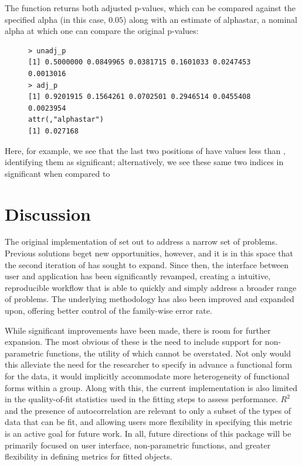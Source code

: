 The  function returns both adjusted p-values, which can be compared against the specified alpha (in this case, $0.05$) along with an estimate of alphastar, a nominal alpha at which one can compare the original p-values:

\begin{singlespace}
\begin{figure}[H]
\centering
\begin{BVerbatim}
> unadj_p
[1] 0.5000000 0.0849965 0.0381715 0.1601033 0.0247453 0.0013016
> adj_p
[1] 0.9201915 0.1564261 0.0702501 0.2946514 0.0455408 0.0023954
attr(,"alphastar")
[1] 0.027168
\end{BVerbatim}
\end{figure}
\end{singlespace}

Here, for example, we see that the last two positions of  have values less than , identifying them as significant; alternatively, we see these same two indices in  significant when compared to 

\section{Discussion}


The original implementation of  set out to address a narrow set of problems. Previous solutions beget new opportunities, however, and it is in this space that the second iteration of  has sought to expand. Since then, the interface between user and application has been significantly revamped, creating a intuitive, reproducible workflow that is able to quickly and simply address a broader range of problems. The underlying methodology has also been improved and expanded upon, offering better control of the family-wise error rate.

While significant improvements have been made, there is room for further expansion. The most obvious of these is the need to include support for non-parametric functions, the utility of which cannot be overstated. Not only would this alleviate the need for the researcher to specify in advance a functional form for the data, it would implicitly accommodate more heterogeneity of functional forms within a group. Along with this, the current implementation is also limited in the quality-of-fit statistics used in the fitting steps to assess performance. $R^2$ and the presence of autocorrelation are relevant to only a subset of the types of data that can be fit, and allowing users more flexibility in specifying this metric is an active goal for future work. In all, future directions of this package will be primarily focused on user interface, non-parametric functions, and greater flexibility in defining metrics for fitted objects.



